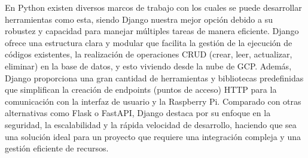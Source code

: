 %
En Python existen diversos marcos de trabajo con los cuales se puede desarrollar herramientas como esta, siendo Django nuestra mejor opción debido a su robustez y capacidad para manejar múltiples tareas de manera eficiente. Django ofrece una estructura clara y modular que facilita la gestión de la ejecución de códigos existentes, la realización de operaciones CRUD (crear, leer, actualizar, eliminar) en la base de datos, y esto viviendo desde la nube de GCP. Además, Django proporciona una gran cantidad de herramientas y bibliotecas predefinidas que simplifican la creación de endpoints (puntos de acceso) HTTP para la comunicación con la interfaz de usuario y la Raspberry Pi. Comparado con otras alternativas como Flask o FastAPI, Django destaca por su enfoque en la seguridad, la escalabilidad y la rápida velocidad de desarrollo, haciendo que sea una solución ideal para un proyecto que requiere una integración compleja y una gestión eficiente de recursos. \\